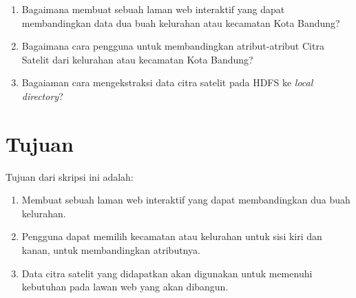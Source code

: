 \documentclass[a4paper,twoside]{article}
\begin{document}
\begin{enumerate}
	\item Bagaimana membuat sebuah laman web interaktif yang dapat membandingkan data dua buah kelurahan atau kecamatan Kota Bandung?
	\item Bagaimana cara pengguna untuk membandingkan atribut-atribut Citra Satelit dari kelurahan atau kecamatan Kota Bandung?
	\item Bagaiaman cara mengekstraksi data citra satelit pada HDFS ke \textit{local directory}?	
\end{enumerate}

\section{Tujuan}
Tujuan dari skripsi ini adalah:
\begin{enumerate}
	\item Membuat sebuah laman web interaktif yang dapat membandingkan dua buah kelurahan.
	\item Pengguna dapat memilih kecamatan atau kelurahan untuk sisi kiri dan kanan, untuk membandingkan atributnya.
	\item Data citra satelit yang didapatkan akan digunakan untuk memenuhi kebutuhan pada lawan web yang akan dibangun.
\end{enumerate}
\end{document}

